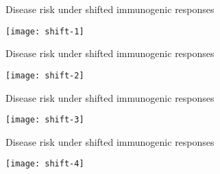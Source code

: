 \documentclass{beamer}
\begin{document}

\begin{frame}[c]{Disease risk under shifted immunogenic responses}

\hspace*{-1cm}\texttt{[image: shift-1]}

\note{
}

\end{frame}


\begin{frame}[c]{Disease risk under shifted immunogenic responses}

\hspace*{-1cm}\texttt{[image: shift-2]}

\note{
}

\end{frame}


\begin{frame}[c]{Disease risk under shifted immunogenic responses}

\hspace*{-1cm}\texttt{[image: shift-3]}

\note{
}

\end{frame}


\begin{frame}[c]{Disease risk under shifted immunogenic responses}

\hspace*{-1cm}\texttt{[image: shift-4]}

\note{
}

\end{frame}

\end{document}
